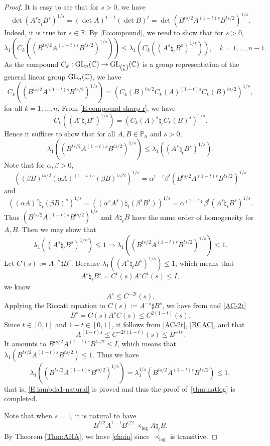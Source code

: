 \documentclass[12pt, reqno]{amsart}
\numberwithin{equation}{section}
\theoremstyle{definition}
\renewcommand{\le}{\leqslant}
\def\GL{{\rm GL}}
\def\R{\mathbb R}
\def\C{\mathbb C}
\def\P{\mathbb P}
\begin{document}
\begin{proof}
It is easy to see that for $s>0$, we have
\[
\det (A^{s} \natural_t B^{s})^{1/s} = (\det A)^{1-t} (\det B)^{t} =\det \left(B^{ts/2}A^{(1-t)s}B^{ts/2} \right)^{1/s}.
\]
Indeed, it is true for $s\in \R$.
By
\eqref{E:compound}, we need to show that for $s>0$,
\[
\lambda_1({C_k}((B^{ts/2}A^{(1-t)s}B^{ts/2} )^{1/s})) \le \lambda_1(C_k((A^{s} \natural_t B^{s})^{1/s})), \quad k=1, \dots, n-1.
\]
As the compound $C_k: \GL_n(\C) \to \GL_{n\choose k}(\C)$ is a group representation of the general linear group $\GL_n(\C)$, we have
\[
C_k((B^{ts/2}A^{(1-t)s}B^{ts/2})^{1/s}) = (C_k(B)^{ts/2}C_k(A)^{(1-t)s}C_k(B)^{ts/2})^{1/s}, 
\]
for all $k=1, \dots, n$.  From \eqref{E:compound-sharp-r}, we have
\[
C_k((A^{s} \natural_t B^{s})^{1/s}) = (C_k(A)^s\natural_t C_k(B)^s)^{1/s}.
\]
Hence it suffices to show that for all $A, B\in \P_n$ and $s>0$,
\begin{equation}\label{eqn:lambda3}
 \lambda_1((B^{ts/2}A^{(1-t)s}B^{ts/2})^{1/s}) \le \lambda_1((A^s\natural_t B^s)^{1/s}).
\end{equation}
Note that for $\alpha , \beta >0$,
\[
((\beta B)^{ts/2}(\alpha A)^{(1-t)s}(\beta B)^{ts/2})^{1/s} = \alpha^{1-t}\beta^t  (B^{ts/2}A^{(1-t)s}B^{ts/2})^{1/s}
\]
and
\[
 ((\alpha A)^s\natural_t (\beta B)^s)^{1/s} = ((\alpha^s A^s)\natural_t (\beta^s B^s))^{1/s} = \alpha^{(1-t)} \beta^{t} (A^s\natural_t B^s)^{1/s}.
\]
Thus $(B^{ts/2}A^{(1-t)s}B^{ts/2})^{1/s}$ and $A\natural_t  B$ have the same order of homogeneity for $A, B$. Then we may show that 
\begin{equation}\label{E:lambda1-natural}
\lambda_1((A^s\natural_t B^s)^{1/s}) \le 1 \Rightarrow \lambda_1((B^{ts/2}A^{(1-t)s}B^{ts/2})^{1/s})\le 1.
\end{equation}
Let $C(s):= A^{-s}\sharp B^s$.
Because $\lambda_1((A^s\natural_t B^s)^{1/s})\le 1$, which means that \[A^s\natural_t B^s = C^t(s)A^sC^t(s) \le I,\] 
we know \cite[p.114]{Bh97}
\begin{equation}
A^s\le C^{-2t}(s). \label{AC-2t}
\end{equation}
Applying the Riccati equation to $C(s):= A^{-s}\sharp B^s$, we have from \cite[p.11]{Bh07} and \eqref{AC-2t}
\begin{equation}
B^s =  C(s)A^sC(s) \le C^{2(1-t)}(s). \label{BCAC}
\end{equation}
Since $t\in [0, 1]$ and $1-t\in [0, 1]$, it follows from \eqref{AC-2t}, \eqref {BCAC}, and \cite[p.115]{Bh97} that
\[
A^{(1-t)s} \le C^{-2t(1-t)}(s) \le B^{-ts}.
\]
It amounts to $B^{ts/2}A^{(1-t)s}B^{ts/2} \le I$, which means that 
$ \lambda_1(B^{ts/2}A^{(1-t)s}B^{ts/2}) 
 \le 1$.  Thus we have
 \[
 \lambda_1((B^{ts/2}A^{(1-t)s}B^{ts/2})^{1/s}) = \lambda_1^{1/s}(B^{ts/2}A^{(1-t)s}B^{ts/2}) \le 1,
\]
that is, \eqref{E:lambda1-natural} is proved and thus the proof of~\eqref{thm:natlog} is completed.

Note that when $s=1$, it is natural to have
\[
B^{t/2}A^{1-t} B^{t/2} \prec_{\log} A\natural_t B.
\]
By Theorem \ref{Thm:AHA}, we have \eqref{chain} since $\prec_{\log}$ is transitive.
\end{proof}
\end{document}
